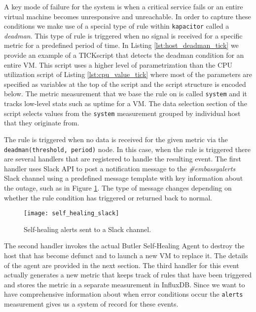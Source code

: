 A key mode of failure for the system is when a critical service fails or an entire virtual machine becomes unresponsive and unreachable. In order to capture these conditions we make use of a special type of rule within \texttt{kapacitor} called a \emph{deadman}. This type of rule is triggered when no signal is received for a specific metric for a predefined period of time. In Listing \ref{lst:host_deadman_tick} we provide an example of a TICKscript that detects the deadman condition for an entire VM. This script uses a higher level of parametrization than the CPU utilization script of Listing \ref{lst:cpu_value_tick} where most of the parameters are specified as variables at the top of the script and the script structure is encoded below. The metric measurement that we base the rule on is called \texttt{system} and it tracks low-level stats such as uptime for a VM. The data selection section of the script selects values from the \texttt{system} measurement grouped by individual host that they originate from.

The rule is triggered when no data is received for the given metric via the \texttt{deadman(threshold, period)} node. In this case, when the rule is triggered there are several handlers that are registered to handle the resulting event. The first handler uses Slack API\autocite{slack} to post a notification message to the \emph{\#embassyalerts} Slack channel using a predefined message template with key information about the outage, such as in Figure \ref{fig:self_healing_slack}. The type of message changes depending on whether the rule condition has triggered or returned back to normal.

\begin{figure}[h]
    \texttt{[image: self\_healing\_slack]}
    \centering
    \caption {Self-healing alerts sent to a Slack channel.}
    \label{fig:self_healing_slack}
\end{figure} 

The second handler invokes the actual Butler Self-Healing Agent to destroy the host that has become defunct and to launch a new VM to replace it. The details of the agent are provided in the next section. The third handler for this event actually generates a new metric that keeps track of rules that have been triggered and stores the metric in a separate measurement in InfluxDB. Since we want to have comprehensive information about when error conditions occur the \texttt{alerts} measurement gives us a system of record for these events.

